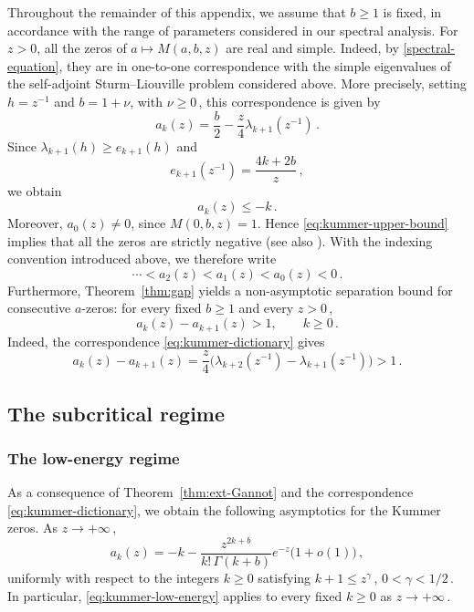 \documentclass[11pt]{amsart}
\numberwithin{equation}{section}
\theoremstyle{remark}
\newcommand{\mn}{\medskip\noindent}
\begin{document}
\mn
\mn
Throughout the remainder of this appendix, we assume that $b\geq1$ is
fixed, in accordance with the range of parameters considered in our
spectral analysis. For $z>0$, all the zeros of
$a\mapsto M(a,b,z)$ are real and simple. Indeed, by
\eqref{spectral-equation}, they are in one-to-one correspondence
with the simple eigenvalues of the self-adjoint Sturm--Liouville problem
considered above. More precisely, setting $h=z^{-1}$ and $b=1+\nu$,
with $\nu\geq0\,$, this correspondence is given by
\begin{equation}\label{eq:kummer-dictionary}
	a_k(z)=\frac b2-\frac z4\lambda_{k+1}(z^{-1})\,.
\end{equation}
Since $\lambda_{k+1}(h)\geq e_{k+1}(h)$ and
\begin{equation}\label{eq:kummer-ek}
	e_{k+1}(z^{-1})=\frac{4k+2b}{z}\,,
\end{equation}
we obtain
\begin{equation}\label{eq:kummer-upper-bound}
	a_k(z)\leq-k\,.
\end{equation}
Moreover, $a_0(z)\neq0$, since $M(0,b,z)=1$. Hence
\eqref{eq:kummer-upper-bound} implies that all the zeros are strictly
negative (see also \cite[Theorem~1.6]{Vanlaere}). With the indexing convention introduced above, we therefore
write
\begin{equation}\label{eq:kummer-zero-ordering}
	\cdots<a_2(z)<a_1(z)<a_0(z)<0\,.
\end{equation}
%
Furthermore, Theorem~\ref{thm:gap} yields a non-asymptotic separation bound for consecutive $a$-zeros: for every fixed $b\geq1$ and every $z>0\,$,
\[
a_k(z)-a_{k+1}(z)>1,\qquad k\geq0\,.
\]
Indeed, the correspondence \eqref{eq:kummer-dictionary} gives
\[
a_k(z)-a_{k+1}(z)
=\frac z4\bigl(\lambda_{k+2}(z^{-1})-\lambda_{k+1}(z^{-1})\bigr)
>1\,.
\]
%
\subsection{The subcritical regime}
\subsubsection{The low-energy regime}

As a consequence of Theorem~\ref{thm:ext-Gannot} and the correspondence
\eqref{eq:kummer-dictionary}, we obtain the following asymptotics for the
Kummer zeros. As $z\to+\infty\,$,
\begin{equation}\label{eq:kummer-low-energy}
	a_k(z)
	=
	-k-
	\frac{z^{2k+b}}{k!\,\Gamma(k+b)}
	e^{-z}
	\bigl(1+o(1)\bigr)\,,
\end{equation}
uniformly with respect to the integers $k\geq0$ satisfying
$k+1\leq z^{\gamma}\,$, $0<\gamma<1/2\,$. In particular, \eqref{eq:kummer-low-energy} applies
to every fixed $k\geq0$ as $z\to+\infty\,$.
%
\end{document}
